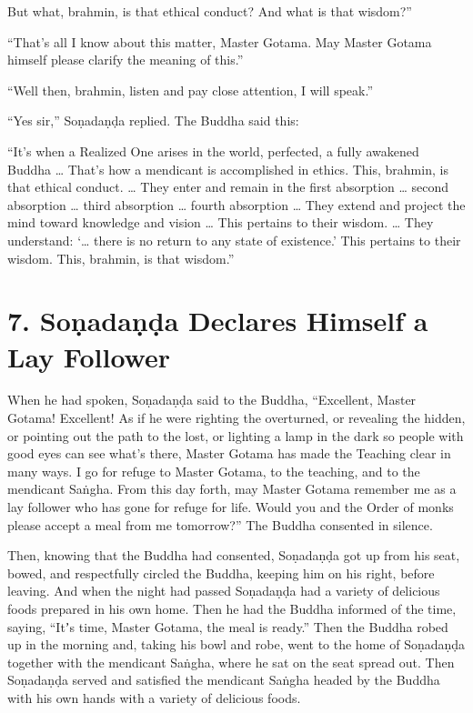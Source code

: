 \documentclass[12pt,openany]{book}%
\begin{document}
But what, brahmin, is that ethical conduct? And what is that wisdom?” 

“That’s all I know about this matter, Master Gotama. May Master Gotama himself please clarify the meaning of this.” 

“Well then, brahmin, listen and pay close attention, I will speak.” 

“Yes sir,” \textsanskrit{Soṇadaṇḍa} replied. The Buddha said this: 

“It’s when a Realized One arises in the world, perfected, a fully awakened Buddha … That’s how a mendicant is accomplished in ethics. This, brahmin, is that ethical conduct. … They enter and remain in the first absorption … second absorption … third absorption … fourth absorption … They extend and project the mind toward knowledge and vision … This pertains to their wisdom. … They understand: ‘… there is no return to any state of existence.’ This pertains to their wisdom. This, brahmin, is that wisdom.” 

\section*{7. \textsanskrit{Soṇadaṇḍa} Declares Himself a Lay Follower }

When he had spoken, \textsanskrit{Soṇadaṇḍa} said to the Buddha, “Excellent, Master Gotama! Excellent! As if he were righting the overturned, or revealing the hidden, or pointing out the path to the lost, or lighting a lamp in the dark so people with good eyes can see what’s there, Master Gotama has made the Teaching clear in many ways. I go for refuge to Master Gotama, to the teaching, and to the mendicant \textsanskrit{Saṅgha}. From this day forth, may Master Gotama remember me as a lay follower who has gone for refuge for life. Would you and the Order of monks please accept a meal from me tomorrow?” The Buddha consented in silence. 

Then, knowing that the Buddha had consented, \textsanskrit{Soṇadaṇḍa} got up from his seat, bowed, and respectfully circled the Buddha, keeping him on his right, before leaving. And when the night had passed \textsanskrit{Soṇadaṇḍa} had a variety of delicious foods prepared in his own home. Then he had the Buddha informed of the time, saying, “Itʼs time, Master Gotama, the meal is ready.” Then the Buddha robed up in the morning and, taking his bowl and robe, went to the home of \textsanskrit{Soṇadaṇḍa} together with the mendicant \textsanskrit{Saṅgha}, where he sat on the seat spread out. Then \textsanskrit{Soṇadaṇḍa} served and satisfied the mendicant \textsanskrit{Saṅgha} headed by the Buddha with his own hands with a variety of delicious foods. 
\end{document}
